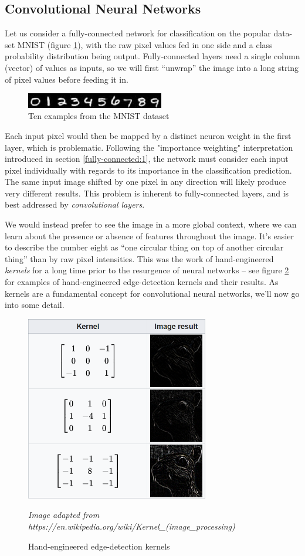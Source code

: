 \documentclass{report}
\begin{document}
\subsection{Convolutional Neural Networks} \label{cnn:1}
Let us consider a fully-connected network for classification on the popular data-set MNIST (figure \ref{fig:mnist:1}), with the raw pixel values fed in one side and a class probability distribution being output. Fully-connected layers need a single column (vector) of values as inputs, so we will first ``unwrap'' the image into a long string of pixel values before feeding it in. \par
\begin{figure}[h]
 \centering
 \includegraphics[width=6cm]{mnist}
 \caption{Ten examples from the MNIST dataset}
 \label{fig:mnist:1}
\end{figure}
Each input pixel would then be mapped by a distinct neuron weight in the first layer, which is problematic. Following the "importance weighting" interpretation introduced in section \ref{fully-connected:1}, the network must consider each input pixel individually with regards to its importance in the classification prediction. The same input image shifted by one pixel in any direction will likely produce very different results. This problem is inherent to fully-connected layers, and is best addressed by \textit{convolutional layers}. \par
We would instead prefer to see the image in a more global context, where we can learn about the presence or absence of features throughout the image. It's easier to describe the number eight as ``one circular thing on top of another circular thing'' than by raw pixel intensities. This was the work of hand-engineered \textit{kernels} for a long time prior to the resurgence of neural networks -- see figure \ref{fig:hand-eng-kernels:1} for examples of hand-engineered edge-detection kernels and their results. As kernels are a fundamental concept for convolutional neural networks, we'll now go into some detail. \par
\begin{figure}[!h]
 \centering
 \includegraphics[width=8cm]{handengkernels}
 \caption{Hand-engineered edge-detection kernels}
 \label{fig:hand-eng-kernels:1}
 \textit{Image adapted from https://en.wikipedia.org/wiki/Kernel\_(image\_processing)}
\end{figure}
\end{document}
